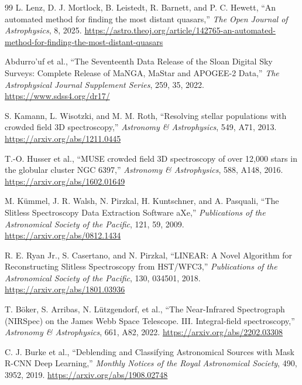 \begin{thebibliography}{99}
L. Lenz, D. J. Mortlock, B. Leistedt, R. Barnett, and P. C. Hewett,
``An automated method for finding the most distant quasars,''
\emph{The Open Journal of Astrophysics}, 8, 2025.
\url{https://astro.theoj.org/article/142765-an-automated-method-for-finding-the-most-distant-quasars}

Abdurro'uf et al.,
``The Seventeenth Data Release of the Sloan Digital Sky Surveys: Complete Release of MaNGA, MaStar and APOGEE-2 Data,''
\emph{The Astrophysical Journal Supplement Series}, 259, 35, 2022.
\url{https://www.sdss4.org/dr17/}

S. Kamann, L. Wisotzki, and M. M. Roth,
``Resolving stellar populations with crowded field 3D spectroscopy,''
\emph{Astronomy \& Astrophysics}, 549, A71, 2013.
\url{https://arxiv.org/abs/1211.0445}

T.-O. Husser et al.,
``MUSE crowded field 3D spectroscopy of over 12,000 stars in the globular cluster NGC 6397,''
\emph{Astronomy \& Astrophysics}, 588, A148, 2016.
\url{https://arxiv.org/abs/1602.01649}

M. K{\"u}mmel, J. R. Walsh, N. Pirzkal, H. Kuntschner, and A. Pasquali,
``The Slitless Spectroscopy Data Extraction Software aXe,''
\emph{Publications of the Astronomical Society of the Pacific}, 121, 59, 2009.
\url{https://arxiv.org/abs/0812.1434}

R. E. Ryan Jr., S. Casertano, and N. Pirzkal,
``LINEAR: A Novel Algorithm for Reconstructing Slitless Spectroscopy from HST/WFC3,''
\emph{Publications of the Astronomical Society of the Pacific}, 130, 034501, 2018.
\url{https://arxiv.org/abs/1801.03936}

T. B\"oker, S. Arribas, N. L\"utzgendorf, et al.,
``The Near-Infrared Spectrograph (NIRSpec) on the James Webb Space Telescope. III. Integral-field spectroscopy,''
\emph{Astronomy \& Astrophysics}, 661, A82, 2022.
\url{https://arxiv.org/abs/2202.03308}

C. J. Burke et al.,
``Deblending and Classifying Astronomical Sources with Mask R-CNN Deep Learning,''
\emph{Monthly Notices of the Royal Astronomical Society}, 490, 3952, 2019.
\url{https://arxiv.org/abs/1908.02748}


\end{thebibliography}
